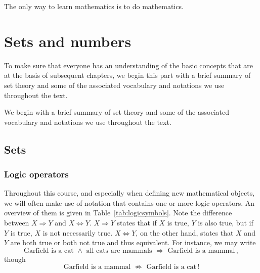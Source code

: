 
\begin{savequote}[75mm]
	The only way to learn mathematics is to do mathematics.
\end{savequote}

\chapter{Sets and numbers}
\graphicspath{{figures/Sets/}}
\label{SetsChapter}
\ifcourse
To make sure that everyone has an understanding of the basic concepts that are at the basis of subsequent chapters, we begin this part with a brief summary of set theory and some of the associated vocabulary and notations we use throughout the text. 
\fi

\ifvc
We begin with a brief summary of set theory and some of the associated vocabulary and notations we use throughout the text. 
\fi

\section{Sets}
\label{sets}
\subsection{Logic operators}
\label{sec:logic operators}
Throughout this course, and especially when defining new mathematical objects, we will often make use of notation that contains one or more logic operators. An overview of them is given in Table~\ref{tab:logicsymbols}. Note the difference between $X \Rightarrow Y$ and $X \Leftrightarrow Y$. $X \Rightarrow Y$ states that if $X$ is true, $Y$ is also true, but if $Y$ is true, $X$ is not necessarily true. $X \Leftrightarrow Y$, on the other hand, states that $X$ and $Y$ are both true or both not true and thus equivalent. For instance, we may write
$$
\text{Garfield is a cat } \wedge\text{ all cats are mammals }  \Rightarrow \text{ Garfield is a mammal}\,,
$$
though 
$$
\text{Garfield is a mammal }  \not\Rightarrow \text{ Garfield is a cat}\,!
$$


